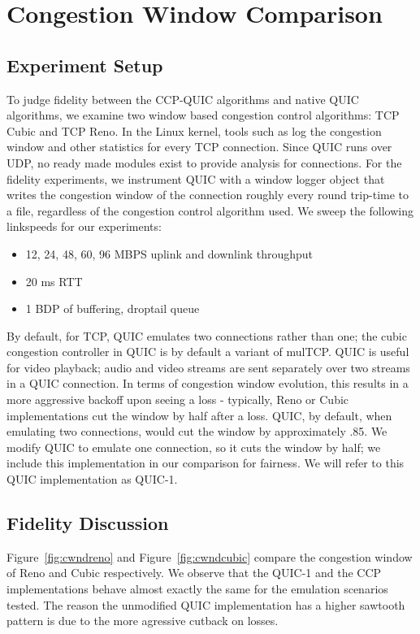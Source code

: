 \section{Congestion Window Comparison}

\subsection*{Experiment Setup}
To judge fidelity between the CCP-QUIC algorithms and native QUIC algorithms, we examine two window based congestion control algorithms: TCP Cubic and TCP Reno.
In the Linux kernel, tools such as  log the congestion window and other statistics for every TCP connection.
Since QUIC runs over UDP, no ready made modules exist to provide analysis for connections.
For the fidelity experiments, we instrument QUIC with a window logger object that writes the congestion window of the connection roughly every round trip-time to a file, regardless of the congestion control algorithm used.
We sweep the following linkspeeds for our experiments:
\begin{itemize}
    \item 12, 24, 48, 60, 96 MBPS uplink and downlink throughput
    \item 20 ms RTT
    \item 1 BDP of buffering, droptail queue
\end{itemize}
By default, for TCP, QUIC emulates two connections rather than one; the cubic congestion controller in QUIC is by default a variant of mulTCP.
QUIC is useful for video playback; audio and video streams are sent separately over two streams in a QUIC connection.
In terms of congestion window evolution, this results in a more aggressive backoff upon seeing a loss - typically, Reno or Cubic implementations cut the window by half after a loss.
QUIC, by default, when emulating two connections, would cut the window by approximately .85.
We modify QUIC to emulate one connection, so it cuts the window by half; we include this implementation in our comparison for fairness.
We will refer to this QUIC implementation as QUIC-1.

\subsection*{Fidelity Discussion}
Figure~\ref{fig:cwndreno} and Figure~\ref{fig:cwndcubic} compare the congestion window of Reno and Cubic respectively.
We observe that the QUIC-1 and the CCP implementations behave almost exactly the same for the emulation scenarios tested.
The reason the unmodified QUIC implementation has a higher sawtooth pattern is due to the more agressive cutback on losses.

